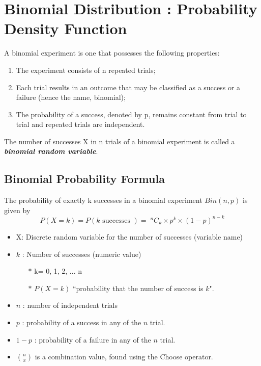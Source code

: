 \documentclass[a4paper,12pt]{article}
\begin{document}
\section*{Binomial Distribution : Probability Density Function}
A binomial experiment is one that possesses the following properties:

\begin{enumerate}
	\item The experiment consists of n repeated trials;
	
\item Each trial results in an outcome that may be classified as a success or a failure (hence the name, binomial);
	
\item The probability of a success, denoted by p, remains constant from trial to trial and repeated trials are independent.
\end{enumerate}


\noindent 
The number of successes X in n trials of a binomial experiment is called a \textbf{\textit{binomial random variable}}.


\subsection*{Binomial Probability Formula}
The probability of exactly k successes in a binomial experiment $Bin(n, p)$ is given by
\[ P(X=k) = P(k \mbox{ successes }) = \;^nC_k  \times p^{k} \times (1-p)^{n-k}\]

\begin{itemize}
	\item X: Discrete random variable for the number of successes (variable name)
	\item $k$ : Number of successes (numeric value)
	\begin{itemize}
		
		\item[$\ast$]  k= 0, 1, 2, ... n
		\item[$\ast$]   $P(X=k)$ ``probability that the number of success is $k$".
	\end{itemize}
	\item $n$ : number of independent trials
	\item $p$ : probability of a success in any of the $n$ trial.
	\item $1-p$ : probability of a failure in any of the $n$ trial.
	\item ${n \choose  x}$ is a combination value, found using the Choose operator.
\end{itemize}
\end{document}
